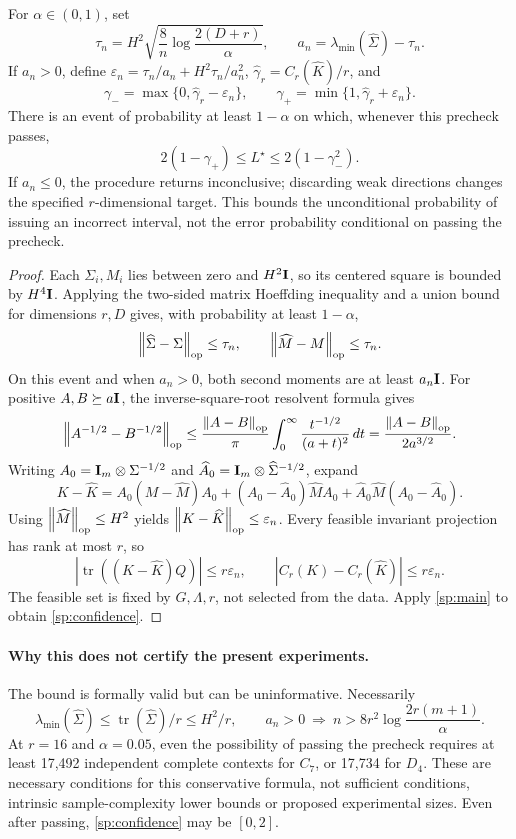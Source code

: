 \begin{spectraltheorem}
\label{sp:finite}
For $\alpha\in(0,1)$, set
\[
 \tau_n=H^2\sqrt{\frac8n\log\frac{2(D+r)}\alpha},\qquad
 a_n=\lambda_{\min}(\widehat\Sigma)-\tau_n.
\]
If $a_n>0$, define $\varepsilon_n=\tau_n/a_n+H^2\tau_n/a_n^2$, $\widehat\gamma_r=C_r(\widehat K)/r$, and
\[
 \gamma_- =\max\{0,\widehat\gamma_r-\varepsilon_n\},\qquad
 \gamma_+ =\min\{1,\widehat\gamma_r+\varepsilon_n\}.
\]
There is an event of probability at least $1-\alpha$ on which, whenever this precheck passes,
\begin{equation}
 2(1-\gamma_+)\le L^\star\le2(1-\gamma_-^2).
 \label{sp:confidence}
\end{equation}
If $a_n\le0$, the procedure returns inconclusive; discarding weak directions changes the specified $r$-dimensional target. This bounds the unconditional probability of issuing an incorrect interval, not the error probability conditional on passing the precheck.
\end{spectraltheorem}
\begin{proof}
Each $\Sigma_i,M_i$ lies between zero and $H^2\mathbf{I}$, so its centered square is bounded by $H^4\mathbf{I}$. Applying the two-sided matrix Hoeffding inequality \citep[Theorem~1.3]{tropp2012user} and a union bound for dimensions $r,D$ gives, with probability at least $1-\alpha$,
\[
 \left\lVert \widehat\Sigma-\Sigma\right\rVert_{\rm op}\le\tau_n,\qquad
 \left\lVert \widehat M-M\right\rVert_{\rm op}\le\tau_n.
\]
On this event and when $a_n>0$, both second moments are at least $a_n\mathbf{I}$. For positive $A,B\succeq a\mathbf{I}$, the inverse-square-root resolvent formula gives
\[
 \left\lVert A^{-1/2}-B^{-1/2}\right\rVert_{\rm op}
 \le\frac{\left\lVert A-B\right\rVert_{\rm op}}\pi\int_0^\infty\frac{t^{-1/2}}{(a+t)^2}\,dt
 =\frac{\left\lVert A-B\right\rVert_{\rm op}}{2a^{3/2}}.
\]
Writing $A_0=\mathbf{I}_m\otimes\Sigma^{-1/2}$ and $\widehat A_0=\mathbf{I}_m\otimes\widehat\Sigma^{-1/2}$, expand
\[
 K-\widehat K=A_0(M-\widehat M)A_0
 +(A_0-\widehat A_0)\widehat M A_0
 +\widehat A_0\widehat M(A_0-\widehat A_0).
\]
Using $\left\lVert \widehat M\right\rVert_{\rm op}\le H^2$ yields $\left\lVert K-\widehat K\right\rVert_{\rm op}\le\varepsilon_n$. Every feasible invariant projection has rank at most $r$, so
\[
 |\operatorname{tr}((K-\widehat K)Q)|\le r\varepsilon_n,
 \qquad |C_r(K)-C_r(\widehat K)|\le r\varepsilon_n.
\]
The feasible set is fixed by $G,\Lambda,r$, not selected from the data. Apply \cref{sp:main} to obtain \cref{sp:confidence}.
\end{proof}

\paragraph{Why this does not certify the present experiments.}
The bound is formally valid but can be uninformative. Necessarily
\[
 \lambda_{\min}(\widehat\Sigma)\le\operatorname{tr}(\widehat\Sigma)/r\le H^2/r,
 \qquad a_n>0\ \Longrightarrow\
 n>8r^2\log\frac{2r(m+1)}\alpha.
\]
At $r=16$ and $\alpha=0.05$, even the possibility of passing the precheck requires at least 17,492 independent complete contexts for $C_7$, or 17,734 for $D_4$. These are necessary conditions for this conservative formula, not sufficient conditions, intrinsic sample-complexity lower bounds or proposed experimental sizes. Even after passing, \cref{sp:confidence} may be $[0,2]$.

